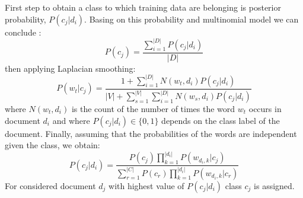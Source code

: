 First step to obtain a class to which training data are belonging is posterior probability, $P(c_j |d_i )$. Basing on this probability and multinomial model we can conclude \cite{5}:
\begin{equation}
P(c_j) = \frac{\sum_{i=1}^{|D|}P(c_j |d_i )}{|D|}
\end{equation}
\newline then applying Laplacian smoothing:
\begin{equation}
P(w_t|c_j)=\frac{1+\sum_{i=1}^{|D|}N(w_t,d_i)P(c_j|d_i)}{|V|+\sum_{s=1}^{|V|} \sum_{i=1}^{|D|}N(w_s,d_i)P(c_j|d_i)}
\end{equation}
\newline 
where $N(w_t,d_i)$ is the count of the number of times the word $w_t$ occurs in document
$d_i$ and where $P(c_j|d_i) \in \{0,1\} $ depends on the class label of the document.
Finally, assuming that the probabilities of the words are independent given the
class, we obtain:
\begin{equation}
P(c_j|d_i)=\frac{P(c_j)\prod_{k=1}^{|d_i|}P(w_{d_i,k}| c_j)}{\sum_{r=1}^{|C|}P(c_r)\prod_{k=1}^{|d_i|}P(w_{d_i,k}|c_r)}
\end{equation}
\newline For considered document $d_j$ with highest value of $P(c_j|d_i)$ class $c_j$ is assigned.


